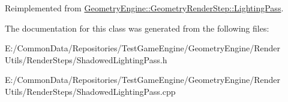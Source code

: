 Reimplemented from \mbox{\hyperlink{class_geometry_engine_1_1_geometry_render_step_1_1_lighting_pass_a3f8631da2e61e9a9092a53395b320ecb}{Geometry\+Engine\+::\+Geometry\+Render\+Step\+::\+Lighting\+Pass}}.



The documentation for this class was generated from the following files\+:\begin{DoxyCompactItemize}
\item 
E\+:/\+Common\+Data/\+Repositories/\+Test\+Game\+Engine/\+Geometry\+Engine/\+Render Utils/\+Render\+Steps/Shadowed\+Lighting\+Pass.\+h\item 
E\+:/\+Common\+Data/\+Repositories/\+Test\+Game\+Engine/\+Geometry\+Engine/\+Render Utils/\+Render\+Steps/Shadowed\+Lighting\+Pass.\+cpp\end{DoxyCompactItemize}
